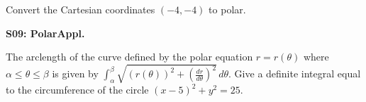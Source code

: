\documentclass[12pt]{article}
\newcommand{\<}{\left\langle}
\renewcommand{\>}{\right\rangle}
\newcommand{\exerciseHeader}[4]{


  \vspace{0.5em}
  \textbf{#2}
  \vspace{0.5em}

}
\begin{document}
\begin{multicols}{2}
Convert the Cartesian coordinates \((-4,-4)\) to polar.




%

%

%

\exerciseHeader{2017 July 06}{S09: PolarAppl.}{
Use polar coordinates to express an arclength or area as a definite integral.
}{2/3}

The arclength of the curve defined by the polar equation \(r=r(\theta)\)
where \(\alpha\leq\theta\leq\beta\) is given by
\(\int_\alpha^\beta\sqrt{(r(\theta))^2+(\frac{dr}{d\theta})^2}\,d\theta\).
Give a definite integral equal to the circumference of the circle
\((x-5)^2+y^2=25\).



%
%
%
%
%


\end{multicols}
\end{document}
